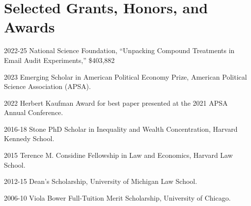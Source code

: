     \section*{Selected Grants, Honors, and Awards}
	\begin{tablist}
	\item[2022-25]	\tab{}National Science Foundation, ``Unpacking Compound Treatments in Email Audit Experiments,'' \$403,882
 	\item[2023] \tab{}Emerging Scholar in American Political Economy Prize, American Political Science Association (APSA).
	\item[2022] \tab{}Herbert Kaufman Award for best paper presented at the 2021 APSA Annual Conference.
    \item[2016-18] \tab{}Stone PhD Scholar in Inequality and Wealth Concentration, Harvard Kennedy School.
    \item[2015] \tab{}Terence M. Considine Fellowship in Law and Economics, Harvard Law School.
    \item[2012-15] \tab{}Dean's Scholarship, University of Michigan Law School.
    \item[2006-10] \tab{}Viola Bower Full-Tuition Merit Scholarship, University of Chicago.
	\end{tablist}
	
